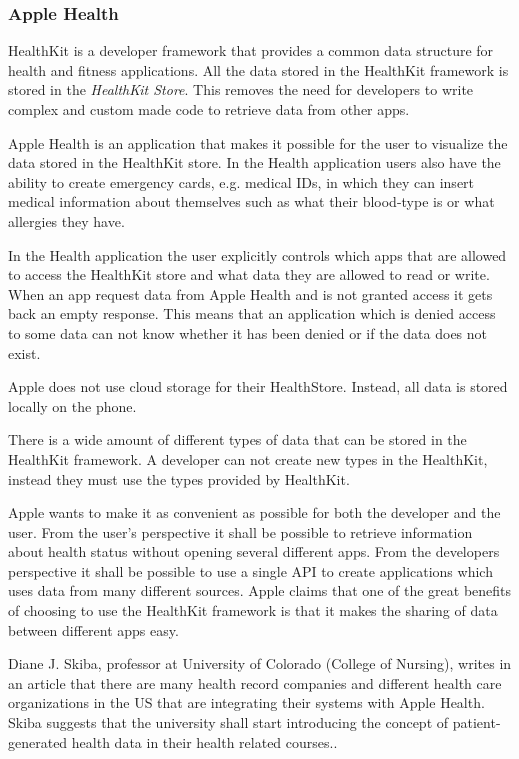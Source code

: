 \documentclass{cslthse-msc}
\begin{document}
\subsubsection{Apple Health}

HealthKit is a developer framework that provides a common data structure for health and fitness applications. All the data stored in the HealthKit framework is stored in the \emph{HealthKit Store}. This removes the need for developers to write complex and custom made code to retrieve data from other apps.\cite{AppleHealthKitFramework}

Apple Health is an application that makes it possible for the user to visualize the data stored in the HealthKit store. In the Health application users also have the ability to create emergency cards, e.g. medical IDs, in which they can insert medical information about themselves such as what their blood-type is or what allergies they have.

In the Health application the user explicitly controls which apps that are allowed to access the HealthKit store and what data they are allowed to read or write. When an app request data from Apple Health and is not granted access it gets back an empty response. This means that an application which is denied access to some data can not know whether it has been denied or if the data does not exist.

Apple does not use cloud storage for their HealthStore. Instead, all data is stored locally on the phone. 

There is a wide amount of different types of data that can be stored in the HealthKit framework. A developer can not create new types in the HealthKit, instead they must use the types provided by HealthKit. 

Apple wants to make it as convenient as possible for both the developer and the user. From the user's perspective it shall be possible to retrieve information about health status without opening several different apps. From the developers perspective it shall be possible to use a single API to create applications which uses data from many different sources. Apple claims that one of the great benefits of choosing to use the HealthKit framework is that it makes the sharing of data between different apps easy.

Diane J. Skiba, professor at University of Colorado (College of Nursing), writes in an article that there are many health record companies and different health care organizations in the US that are integrating their systems with Apple Health\cite{skiba2014connected}. Skiba suggests that the university shall start introducing the concept of patient-generated health data in their health related courses.\cite{skiba2014connected}. 
\end{document}
